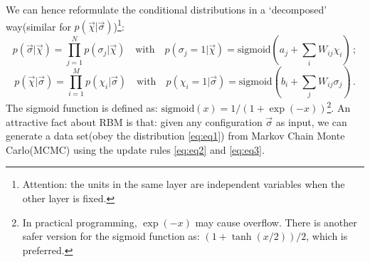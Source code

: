 \documentclass[letterpaper, 10pt]{article}
\begin{document}
We can hence reformulate the conditional distributions
in a `decomposed' way(similar for $ p(\vec{\chi}|\vec{\sigma}) $)\footnote{
Attention: the units in the same layer are independent variables when the other layer is fixed.}:
\begin{equation}
p(\vec{\sigma}|\vec{\chi}) = \prod_{j=1}^{N} p(\sigma_j | \vec{\chi})
\quad{} \mathrm{with} \quad{} p(\sigma_j=1 | \vec{\chi}) =
\mathrm{sigmoid}(a_j + \sum_i W_{ij}\chi_i)\,; \label{eq:eq2}
\end{equation}
\begin{equation}
p(\vec{\chi}|\vec{\sigma}) = \prod_{i=1}^{M} p(\chi_i | \vec{\sigma})
\quad{} \mathrm{with} \quad{} p(\chi_i=1 | \vec{\sigma}) =
\mathrm{sigmoid}(b_i + \sum_j W_{ij}\sigma_j)\,.\label{eq:eq3}
\end{equation}
The sigmoid function is defined as: $ \mathrm{sigmoid}(x) = 1/(1+\exp{(-x)}) $\footnote{
In practical programming, $\exp(-x)$ may cause overflow. 
There is another safer version for the sigmoid function as: $ (1+\tanh{(x/2)})/2 $, which is preferred.}. 
An attractive fact about RBM is that: given any configuration $\vec{\sigma}$ as input, 
we can generate a data set(obey the distribution \ref{eq:eq1}) from Markov Chain Monte Carlo(MCMC) 
using the update rules \ref{eq:eq2} and \ref{eq:eq3}.
\end{document}

